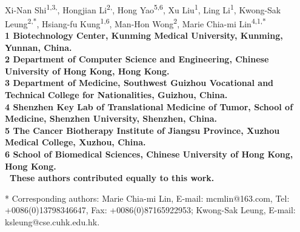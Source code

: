\documentclass[10pt,letterpaper]{article}
\date{}
\begin{document}
\vspace*{0.35in}

\begin{flushleft}
{\Large
\textbf{}
}
\newline
\\
Xi-Nan Shi\textsuperscript{1,3,\dag},%
Hongjian Li\textsuperscript{2,\dag},%
Hong Yao\textsuperscript{5,6},%
Xu Liu\textsuperscript{1},%
Ling Li\textsuperscript{1},%
Kwong-Sak Leung\textsuperscript{2,*},%
Hsiang-fu Kung\textsuperscript{1,6},%
Man-Hon Wong\textsuperscript{2},%
Marie Chia-mi Lin\textsuperscript{4,1,*}%
\\
\bf{1} Biotechnology Center, Kunming Medical University, Kunming, Yunnan, China.\\
\bf{2} Department of Computer Science and Engineering, Chinese University of Hong Kong, Hong Kong.\\
\bf{3} Department of Medicine, Southwest Guizhou Vocational and Technical College for Nationalities, Guizhou, China.\\
\bf{4} Shenzhen Key Lab of Translational Medicine of Tumor, School of Medicine, Shenzhen University, Shenzhen, China.\\
\bf{5} The Cancer Biotherapy Institute of Jiangsu Province, Xuzhou Medical College, Xuzhou, China.\\
\bf{6} School of Biomedical Sciences, Chinese University of Hong Kong, Hong Kong.\\

% 
%
\dag\ These authors contributed equally to this work.





* Corresponding authors: Marie Chia-mi Lin, E-mail: mcmlin@163.com, Tel: +0086(0)13798346647, Fax: +0086(0)87165922953; Kwong-Sak Leung, E-mail: ksleung@cse.cuhk.edu.hk.
\end{flushleft}
\end{document}
